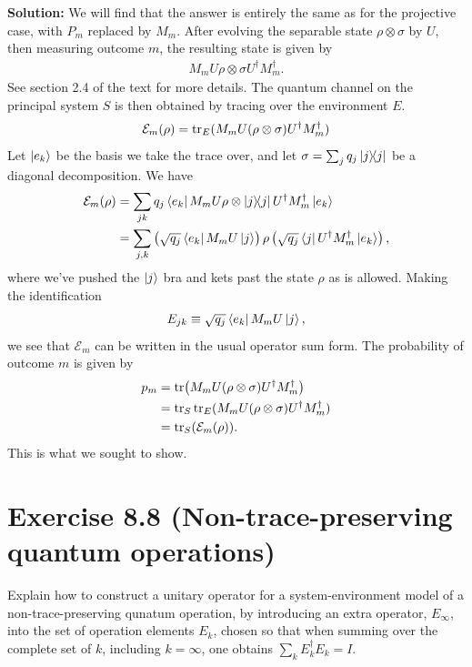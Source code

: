 \documentclass{book}
\begin{document}
    \textbf{Solution:} We will find that the answer is entirely the same as for the projective case, with $P_m$ replaced by $M_m$. After evolving the separable state $\rho \otimes \sigma$ by $U$, then measuring outcome $m$, the resulting state is given by
    \begin{align}
        M_m U \rho \otimes \sigma U^\dagger M_m^\dagger.
    \end{align}
    See section 2.4 of the text for more details. The quantum channel on the principal system $S$ is then obtained by tracing over the environment $E$.
    \begin{align}
        \mathcal{E}_m(\rho) = \tr_E(M_m U (\rho\otimes\sigma)U^\dagger M_m^\dagger)
    \end{align}
    Let $\ket{e_k}$ be the basis we take the trace over, and let $\sigma = \sum_j q_j \ketbra{j}$ be a diagonal decomposition. We have
    \begin{align}
    \begin{aligned}
        \mathcal{E}_m(\rho) &= \sum_{jk} q_j \bra{e_k} M_m U \rho\otimes\ketbra{j} U^\dagger M_m^\dagger\ket{e_k} \\
        &= \sum_{j,k} \left(\sqrt{q_j} \bra{e_k}M_m U \ket{j}\right) \rho \left(\sqrt{q_j} \bra{j}U^\dagger M_m^\dagger \ket{e_k}\right),
    \end{aligned}
    \end{align}
    where we've pushed the $\ket{j}$ bra and kets past the state $\rho$ as is allowed. Making the identification
    \begin{align}
        E_{jk} \equiv \sqrt{q_j} \bra{e_k}M_m U \ket{j},
    \end{align}
    we see that $\mathcal{E}_m$ can be written in the usual operator sum form. The probability of outcome $m$ is given by
    \begin{align}
        p_m &= \tr(M_m U (\rho\otimes\sigma)U^\dagger M_m^\dagger) \\
        &= \tr_S \tr_E (M_m U (\rho\otimes\sigma)U^\dagger M_m^\dagger) \\
        &= \tr_S( \mathcal{E}_m(\rho)).
    \end{align}
    This is what we sought to show.

\section*{Exercise 8.8 (Non-trace-preserving quantum operations)}
    Explain how to construct a unitary operator for a system-environment model of a non-trace-preserving qunatum operation, by introducing an extra operator, $E_\infty$, into the set of operation elements $E_k$, chosen so that when summing over the complete set of $k$, including $k = \infty$, one obtains $\sum_k E_k^\dagger E_k = I$.
\end{document}
